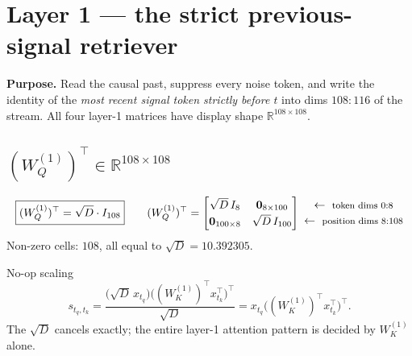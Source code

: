 \documentclass[11pt]{article}
\newcommand{\R}{\mathbb{R}}
\newcommand{\Wq}{W_Q}
\newcommand{\Wk}{W_K}
\newcommand{\sd}{\sqrt{D}}
\newcommand{\rowlab}[1]{\ \leftarrow\ \text{\footnotesize #1}}
\begin{document}
\section{Layer 1 --- the strict previous-signal retriever}

\textbf{Purpose.} Read the causal past, suppress every noise token, and write the identity of the
\emph{most recent signal token strictly before $t$} into dims $108{:}116$ of the stream. All four
layer-1 matrices have display shape $\R^{108\times108}$.

\subsection{$(\Wq^{(1)})^\top\in\R^{108\times108}$}
\begin{equation}
\boxed{(\Wq^{(1)})^\top=\sd\cdot I_{108}}
\qquad
(\Wq^{(1)})^\top=
\begin{bmatrix}
\sd\, I_{8} & \bm{0}_{8\times100}\\[2pt]
\bm{0}_{100\times8} & \sd\, I_{100}
\end{bmatrix}
\begin{matrix}
\rowlab{token dims $0{:}8$}\\[2pt]
\rowlab{position dims $8{:}108$}
\end{matrix}
\end{equation}
Non-zero cells: $108$, all equal to $\sd=10.392305$.

\begin{notebox}{No-op scaling}
\[
s_{t_q,t_k}=\frac{\bigl(\sd\,x_{t_q}\bigr)\bigl((\Wk^{(1)})^\top x_{t_k}^\top\bigr)^\top}{\sd}
= x_{t_q}\bigl((\Wk^{(1)})^\top x_{t_k}^\top\bigr)^\top .
\]
The $\sd$ cancels exactly; the entire layer-1 attention pattern is decided by $\Wk^{(1)}$ alone.
\end{notebox}
\end{document}
